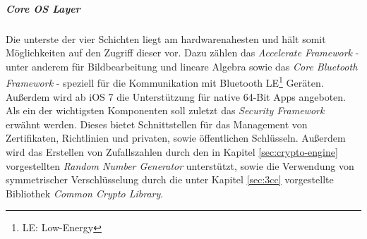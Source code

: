 			\subparagraph{Core OS Layer}
				Die unterste der vier Schichten liegt am hardwarenahesten und hält somit
				Möglichkeiten auf den Zugriff dieser vor. Dazu zählen das \textsl{Accelerate
				Framework} - unter anderem für Bildbearbeitung und lineare Algebra sowie das
				\textsl{Core Bluetooth Framework} - speziell für die Kommunikation mit
				Bluetooth LE\footnote{LE: Low-Energy} Geräten. Außerdem wird ab iOS 7
				die Unterstützung für native 64-Bit Apps angeboten. Als ein der wichtigsten
				Komponenten soll zuletzt das \textsl{Security Framework} erwähnt werden.
				Dieses bietet Schnittstellen für das Management von Zertifikaten, Richtlinien
				und privaten, sowie öffentlichen Schlüsseln. Außerdem wird das Erstellen von
				Zufallszahlen durch den in Kapitel \ref{sec:crypto-engine}
				vorgestellten \textsl{Random Number Generator} unterstützt, sowie die
				Verwendung von symmetrischer Verschlüsselung durch die unter Kapitel
				\ref{sec:3cc} vorgestellte Bibliothek \textsl{Common Crypto Library}.
